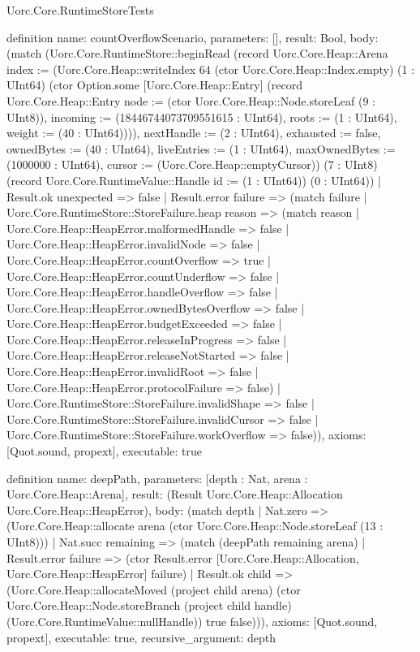 \begin{lexlean}{Uorc.Core.RuntimeStoreTests}
\begin{semanticmodule}
definition{
  name: countOverflowScenario,
  parameters: [],
  result: Bool,
  body: (match (Uorc.Core.RuntimeStore::beginRead (record Uorc.Core.Heap::Arena {index := (Uorc.Core.Heap::writeIndex 64 (ctor Uorc.Core.Heap::Index.empty) (1 : UInt64) (ctor Option.some [Uorc.Core.Heap::Entry] (record Uorc.Core.Heap::Entry {node := (ctor Uorc.Core.Heap::Node.storeLeaf (9 : UInt8)), incoming := (18446744073709551615 : UInt64), roots := (1 : UInt64), weight := (40 : UInt64)}))), nextHandle := (2 : UInt64), exhausted := false, ownedBytes := (40 : UInt64), liveEntries := (1 : UInt64), maxOwnedBytes := (1000000 : UInt64), cursor := (Uorc.Core.Heap::emptyCursor)}) (7 : UInt8) (record Uorc.Core.RuntimeValue::Handle {id := (1 : UInt64)}) (0 : UInt64))
    | Result.ok unexpected => false
    | Result.error failure => (match failure
      | Uorc.Core.RuntimeStore::StoreFailure.heap reason => (match reason
        | Uorc.Core.Heap::HeapError.malformedHandle => false
        | Uorc.Core.Heap::HeapError.invalidNode => false
        | Uorc.Core.Heap::HeapError.countOverflow => true
        | Uorc.Core.Heap::HeapError.countUnderflow => false
        | Uorc.Core.Heap::HeapError.handleOverflow => false
        | Uorc.Core.Heap::HeapError.ownedBytesOverflow => false
        | Uorc.Core.Heap::HeapError.budgetExceeded => false
        | Uorc.Core.Heap::HeapError.releaseInProgress => false
        | Uorc.Core.Heap::HeapError.releaseNotStarted => false
        | Uorc.Core.Heap::HeapError.invalidRoot => false
        | Uorc.Core.Heap::HeapError.protocolFailure => false)
      | Uorc.Core.RuntimeStore::StoreFailure.invalidShape => false
      | Uorc.Core.RuntimeStore::StoreFailure.invalidCursor => false
      | Uorc.Core.RuntimeStore::StoreFailure.workOverflow => false)),
  axioms: [Quot.sound, propext],
  executable: true
}

definition{
  name: deepPath,
  parameters: [depth : Nat, arena : Uorc.Core.Heap::Arena],
  result: (Result Uorc.Core.Heap::Allocation Uorc.Core.Heap::HeapError),
  body: (match depth
    | Nat.zero => (Uorc.Core.Heap::allocate arena (ctor Uorc.Core.Heap::Node.storeLeaf (13 : UInt8)))
    | Nat.succ remaining => (match (deepPath remaining arena)
      | Result.error failure => (ctor Result.error [Uorc.Core.Heap::Allocation, Uorc.Core.Heap::HeapError] failure)
      | Result.ok child => (Uorc.Core.Heap::allocateMoved (project child arena) (ctor Uorc.Core.Heap::Node.storeBranch (project child handle) (Uorc.Core.RuntimeValue::nullHandle)) true false))),
  axioms: [Quot.sound, propext],
  executable: true,
  recursive_argument: depth
}


\end{semanticmodule}
\end{lexlean}
